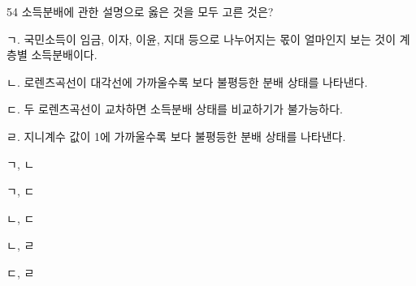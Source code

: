 \begin{question}{54}
소득분배에 관한 설명으로 옳은 것을 모두 고른 것은?
\begin{framedtext}
ㄱ. 국민소득이 임금, 이자, 이윤, 지대 등으로 나누어지는 몫이 얼마인지 보는 것이 계층별 소득분배이다. \par
ㄴ. 로렌츠곡선이 대각선에 가까울수록 보다 불평등한 분배 상태를 나타낸다. \par
ㄷ. 두 로렌츠곡선이 교차하면 소득분배 상태를 비교하기가 불가능하다. \par
ㄹ. 지니계수 값이 1에 가까울수록 보다 불평등한 분배 상태를 나타낸다. \par
\end{framedtext}
\begin{choices}
  \item ㄱ, ㄴ
  \item ㄱ, ㄷ
  \item ㄴ, ㄷ
  \item ㄴ, ㄹ
  \item ㄷ, ㄹ
\end{choices}
\end{question}
